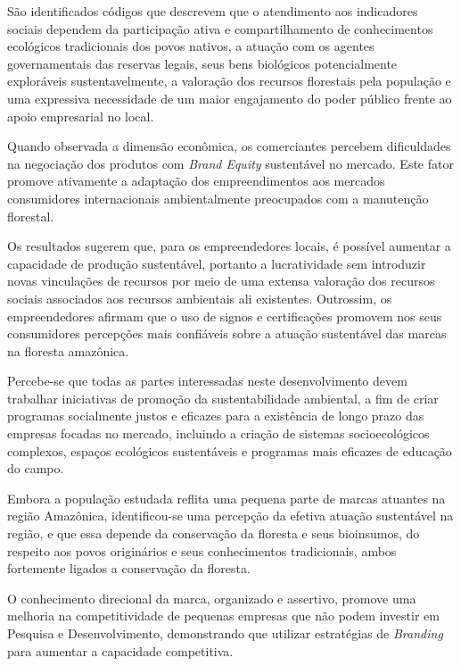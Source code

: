 São identificados códigos que descrevem que o atendimento aos indicadores sociais dependem da participação ativa e compartilhamento de conhecimentos ecológicos tradicionais dos povos nativos, a atuação com os agentes governamentais das reservas legais, seus bens biológicos potencialmente exploráveis sustentavelmente, a valoração dos recursos florestais pela população e uma expressiva necessidade de um maior engajamento do poder público frente ao apoio empresarial no local.

Quando observada a dimensão econômica, os comerciantes percebem dificuldades na negociação dos produtos com \textit{Brand Equity} sustentável no mercado. Este fator promove ativamente a adaptação dos empreendimentos aos mercados consumidores internacionais ambientalmente preocupados com a manutenção florestal. 

Os resultados sugerem que, para os empreendedores locais, é possível aumentar a capacidade de produção sustentável, portanto a lucratividade sem introduzir novas vinculações de recursos por meio de uma extensa valoração dos recursos sociais associados aos recursos ambientais ali existentes. Outrossim, os empreendedores afirmam que o uso de signos e certificações promovem nos seus consumidores percepções mais confiáveis sobre a atuação sustentável das marcas na floresta amazônica. 

Percebe-se que todas as partes interessadas neste desenvolvimento devem trabalhar iniciativas de promoção da sustentabilidade ambiental, a fim de criar programas socialmente justos e eficazes para a existência de longo prazo das empresas focadas no mercado, incluindo a criação de sistemas socioecológicos complexos, espaços ecológicos sustentáveis e programas mais eficazes de educação do campo.

Embora a população estudada reflita uma pequena parte de marcas atuantes na região Amazônica, identificou-se uma percepção da efetiva atuação sustentável na região, e que essa depende da conservação da floresta e seus bioinsumos, do respeito aos povos originários e seus conhecimentos tradicionais, ambos fortemente ligados a conservação da floresta.

O conhecimento direcional da marca, organizado e assertivo, promove uma melhoria na competitividade de pequenas empresas que não podem investir em Pesquisa e Desenvolvimento, demonstrando que utilizar estratégias de \textit{Branding} para aumentar a capacidade competitiva.